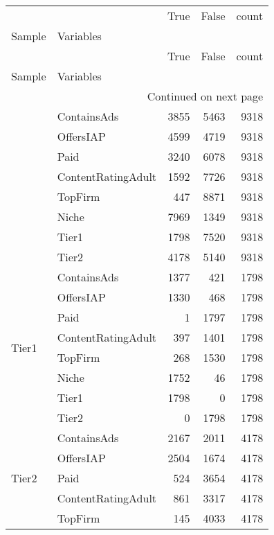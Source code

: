 \begin{longtable}[h!]{llrrr}
\toprule
        &       &  True &  False &  count \\
Sample & Variables &       &        &        \\
\midrule
\endfirsthead

\toprule
        &       &  True &  False &  count \\
Sample & Variables &       &        &        \\
\midrule
\endhead
\midrule
\multicolumn{5}{r}{{Continued on next page}} \\
\midrule
\endfoot

\bottomrule
\endlastfoot
\multirow{8}{*}{Full} & ContainsAds &  3855 &   5463 &   9318 \\
        & OffersIAP &  4599 &   4719 &   9318 \\
        & Paid &  3240 &   6078 &   9318 \\
        & ContentRatingAdult &  1592 &   7726 &   9318 \\
        & TopFirm &   447 &   8871 &   9318 \\
        & Niche &  7969 &   1349 &   9318 \\
        & Tier1 &  1798 &   7520 &   9318 \\
        & Tier2 &  4178 &   5140 &   9318 \\
\cline{1-5}
\multirow{8}{*}{Tier1} & ContainsAds &  1377 &    421 &   1798 \\
        & OffersIAP &  1330 &    468 &   1798 \\
        & Paid &     1 &   1797 &   1798 \\
        & ContentRatingAdult &   397 &   1401 &   1798 \\
        & TopFirm &   268 &   1530 &   1798 \\
        & Niche &  1752 &     46 &   1798 \\
        & Tier1 &  1798 &      0 &   1798 \\
        & Tier2 &     0 &   1798 &   1798 \\
\cline{1-5}
\multirow{8}{*}{Tier2} & ContainsAds &  2167 &   2011 &   4178 \\
        & OffersIAP &  2504 &   1674 &   4178 \\
        & Paid &   524 &   3654 &   4178 \\
        & ContentRatingAdult &   861 &   3317 &   4178 \\
        & TopFirm &   145 &   4033 &   4178 \\

\end{longtable}
